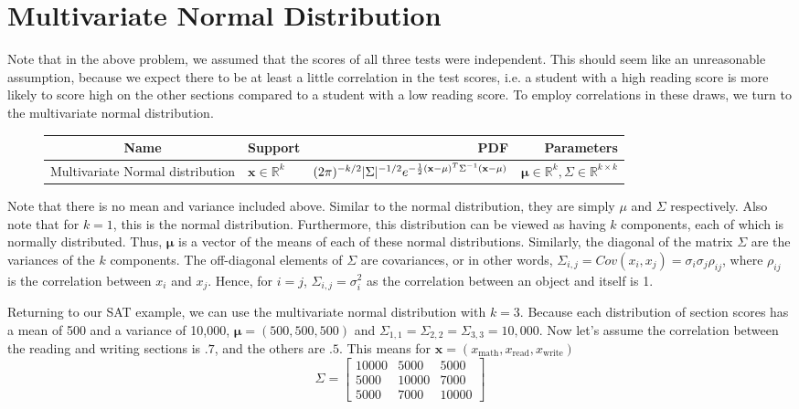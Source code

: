 \section*{Multivariate Normal Distribution}
 Note that in the above problem, we assumed that the scores of all three tests were independent. This should seem like an unreasonable assumption, because we expect there to be at least a little correlation in the test scores, i.e. a student with a high reading score is more likely to score high on the other sections compared to a student with a low reading score. To employ correlations in these draws, we turn to the multivariate normal distribution. 
 
 \begin{figure}[h!]
\begin{center}
\begin{tabular}{|c|l|r|r|}
	\hline
Name & Support &  PDF & Parameters \\
\hline
Multivariate Normal distribution  & $\mathbf{x} \in \mathbb{R}^k$ &$(2\pi)^{-k/2}|\Sigma|^{-1/2}e^{-\frac{1}{2}(\mathbf{x} - \mathbf\mathbf{\mu})^T \Sigma^{-1} (\mathbf{x}-\mathbf{\mu})} $ & $\mathbf{\mu}\in \mathbb{R}^k, \Sigma \in \mathbb{R}^{k\times k}$ \\
\hline
\end{tabular}
\end{center}
\end{figure}
Note that there is no mean and variance included above. Similar to the normal distribution, they are simply $\mu$ and $\Sigma$ respectively. Also note that for $k=1$, this is the normal distribution.  Furthermore, this distribution can be viewed as having $k$ components, each of which is normally distributed. Thus, $\mathbf{\mu}$ is a vector of the means of each of these normal distributions. Similarly, the diagonal of the matrix $\Sigma$ are the variances of the $k$ components. The off-diagonal elements of $\Sigma$ are covariances, or in other words, $\Sigma_{i,j} = Cov(x_i,x_j) = \sigma_i \sigma_j \rho_{ij}$, where $\rho_{ij}$ is the correlation between $x_i$ and $x_j$. Hence, for $i=j$, $\Sigma_{i,j} = \sigma^2_i$ as the correlation between an object and itself is 1. 

Returning to our SAT example, we can use the multivariate normal distribution with $k=3$. Because each distribution of section scores has a mean of 500 and a variance of 10,000, $\mathbf{\mu} = (500,500,500)$ and $\Sigma_{1,1} = \Sigma_{2,2} = \Sigma_{3,3} = 10,000$. Now let's assume the correlation between the reading and writing sections is $.7$, and the others are $.5$. This means for $\mathbf{x} = (x_{\text{math}},x_{\text{read}},x_{\text{write}})$
\[ \Sigma = \left[ \begin{array}{ccc}
10000 & 5000 & 5000 \\
5000 & 10000 & 7000 \\
5000 & 7000 & 10000 \end{array} \right]\]  

